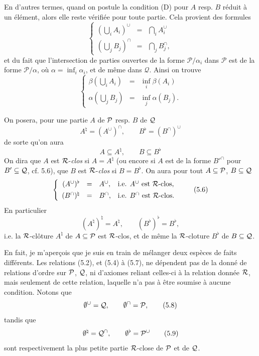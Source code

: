 En d'autres termes, quand on postule la condition (D) pour $A$ resp. $B$ réduit à un élément, alors elle reste vérifiée pour toute partie. Cela provient des formules
\[
\left\{
\begin{array}{lcl}
(\bigcup_i A_i)^\cup & = & \bigcap_i A_i^\cup \\[1ex]
(\bigcup_j B_j)^\cap & = & \bigcap_j B_j^\cap,
\end{array}
\right.
\tag*{(5.2)}
\]
et du fait que l'intersection de parties ouvertes de la forme $\mathcal{P}/\alpha_i$ dans $\mathcal{P}$ est de la forme $\mathcal{P}/\alpha$, où $\alpha = \inf_i \alpha_i$, et de même dans $\mathcal{Q}$. Ainsi on trouve
\[
\left\{
\begin{array}{lcl}
\beta(\bigcup_i A_i) & = & \inf_i \beta(A_i) \\[1ex]
\alpha(\bigcup_j B_j) & = & \inf_j \alpha(B_j).
\end{array}
\right.
\tag*{(5.3)}
\]


On posera, pour une partie $A$ de $\mathcal{P}$ resp. $B$ de $\mathcal{Q}$
\[
A^{\natural} = (A^{\cup})^{\cap}, \qquad B^{\flat} = (B^{\cap})^{\cup}
\tag*{(5.4)}
\]
de sorte qu'on aura
\[
A \subseteq A^{\natural}, \qquad B \subseteq B^{\flat}
\tag*{(5.5)}
\]
On dira que $A$ est $\mathcal{R}$-\textit{clos} si $A = A^{\natural}$ (ou encore si $A$ est de la forme $B'^{\cap}$ pour $B' \subseteq \mathcal{Q}$, cf. 5.6), que
$B$ est $\mathcal{R}$-\textit{clos} si $B = B^{\flat}$. On aura pour tout $A \subseteq \mathcal{P}$, $B \subseteq \mathcal{Q}$
\[
\left\{
\begin{array}{rcll}
(A^{\cup})^{\flat} & = & A^{\cup}, & \text{i.e. } A^{\cup} \text{ est } \mathcal{R}\text{-clos,}\\[1ex]
(B^{\cap})^{\natural} & = & B^{\cap}, & \text{i.e. } B^{\cap} \text{ est } \mathcal{R}\text{-clos.}
\end{array}
\right.
\tag*{(5.6)}
\]
En particulier
\[
(A^{\natural})^{\natural} = A^{\natural}, \qquad (B^{\flat})^{\flat} = B^{\flat},
\tag*{(5.7)}
\]
i.e. la $\mathcal{R}$-clôture $A^{\natural}$ de $A \subseteq \mathcal{P}$ est $\mathcal{R}$-clos, et de même la $\mathcal{R}$-cloture $B^{\flat}$ de $B \subseteq \mathcal{Q}$. %

En fait, je m'aperçois que je suis en train de mélanger deux espèces de faits différents. Les relations (5.2), et (5.4) à (5.7), ne dépendent pas de la donné de relations d'ordre sur $\mathcal{P}$, $\mathcal{Q}$, ni d'axiomes reliant celles-ci à la relation donnée $\mathcal{R}$, mais seulement de cette relation, laquelle n'a pas à être soumise à aucune condition. Notons que %
\[
\emptyset^{\cup} = \mathcal{Q}, \qquad \emptyset^{\cap} = \mathcal{P},
\tag*{(5.8)}
\]
tandis que
\[
\emptyset^{\natural} = \mathcal{Q}^{\cap}, \qquad \emptyset^{\flat} = \mathcal{P}^{\cup}
\tag*{(5.9)}
\]
sont respectivement la plus petite partie $\mathcal{R}$-close de $\mathcal{P}$ et de $\mathcal{Q}$.

